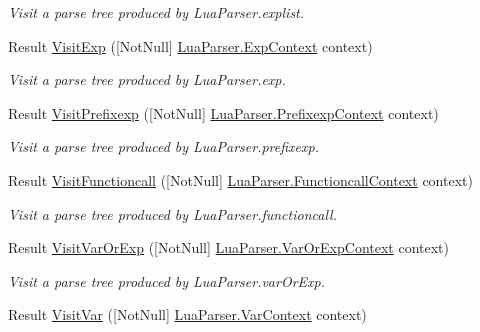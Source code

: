 \begin{DoxyCompactItemize}
\begin{DoxyCompactList}\small\item\em Visit a parse tree produced by Lua\+Parser.\+explist. \end{DoxyCompactList}\item 
Result \mbox{\hyperlink{interfacezlua_1_1_i_lua_visitor_a9fc764fe97efdcef87b716de7d157d72}{Visit\+Exp}} (\mbox{[}Not\+Null\mbox{]} \mbox{\hyperlink{classzlua_1_1_lua_parser_1_1_exp_context}{Lua\+Parser.\+Exp\+Context}} context)
\begin{DoxyCompactList}\small\item\em Visit a parse tree produced by Lua\+Parser.\+exp. \end{DoxyCompactList}\item 
Result \mbox{\hyperlink{interfacezlua_1_1_i_lua_visitor_a76880eb7fdd84285caa8759ecabd8aca}{Visit\+Prefixexp}} (\mbox{[}Not\+Null\mbox{]} \mbox{\hyperlink{classzlua_1_1_lua_parser_1_1_prefixexp_context}{Lua\+Parser.\+Prefixexp\+Context}} context)
\begin{DoxyCompactList}\small\item\em Visit a parse tree produced by Lua\+Parser.\+prefixexp. \end{DoxyCompactList}\item 
Result \mbox{\hyperlink{interfacezlua_1_1_i_lua_visitor_ac5b248028640e893638d96fee0463367}{Visit\+Functioncall}} (\mbox{[}Not\+Null\mbox{]} \mbox{\hyperlink{classzlua_1_1_lua_parser_1_1_functioncall_context}{Lua\+Parser.\+Functioncall\+Context}} context)
\begin{DoxyCompactList}\small\item\em Visit a parse tree produced by Lua\+Parser.\+functioncall. \end{DoxyCompactList}\item 
Result \mbox{\hyperlink{interfacezlua_1_1_i_lua_visitor_a5b0f7be633f04468e77f13dc194c2511}{Visit\+Var\+Or\+Exp}} (\mbox{[}Not\+Null\mbox{]} \mbox{\hyperlink{classzlua_1_1_lua_parser_1_1_var_or_exp_context}{Lua\+Parser.\+Var\+Or\+Exp\+Context}} context)
\begin{DoxyCompactList}\small\item\em Visit a parse tree produced by Lua\+Parser.\+var\+Or\+Exp. \end{DoxyCompactList}\item 
Result \mbox{\hyperlink{interfacezlua_1_1_i_lua_visitor_aabb3bb5fa7b497446863e037f93733e7}{Visit\+Var}} (\mbox{[}Not\+Null\mbox{]} \mbox{\hyperlink{classzlua_1_1_lua_parser_1_1_var_context}{Lua\+Parser.\+Var\+Context}} context)

\end{DoxyCompactItemize}
